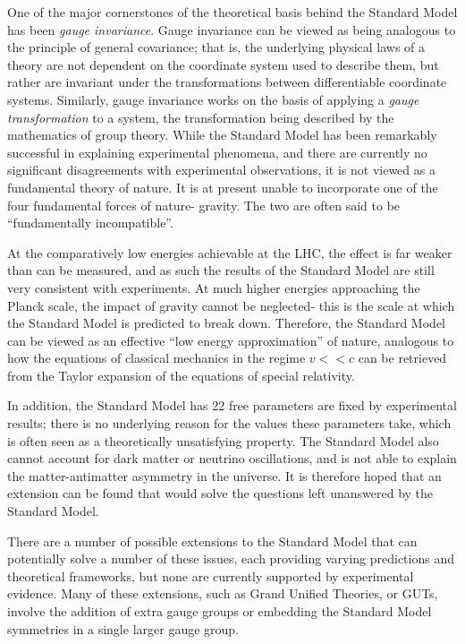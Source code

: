 \documentclass{article}
\begin{document}
One of the major cornerstones of the theoretical basis behind the Standard Model has been \textit{gauge invariance}. Gauge invariance can be viewed as being analogous to the principle of general covariance; that is, the underlying physical laws of a theory are not dependent on the coordinate system used to describe them, but rather are invariant under the transformations between differentiable coordinate systems. Similarly, gauge invariance works on the basis of applying a \textit{gauge transformation} to a system, the transformation being described by the mathematics of group theory. 
While the Standard Model has been remarkably successful in explaining experimental phenomena, and there are currently no significant disagreements with experimental observations, it is not viewed as a fundamental theory of nature. It is at present unable to incorporate one of the four fundamental forces of nature- gravity. The two are often said to be ``fundamentally incompatible''.

At the comparatively low energies achievable at the LHC, the effect is far weaker than can be measured, and as such the results of the Standard Model are still very  consistent with experiments. At much higher energies approaching the Planck scale, the impact of gravity cannot be neglected- this is the scale at which the Standard Model is predicted to break down. Therefore, the Standard Model can be viewed as an effective ``low energy approximation'' of nature, analogous to how the equations of classical mechanics in the regime $v<<c$ can be retrieved from the Taylor expansion of the equations of special relativity.

In addition, the Standard Model has 22 free parameters are fixed by experimental results; there is no underlying reason for the values these parameters take, which is often seen as a theoretically unsatisfying property. The Standard Model also cannot account for dark matter or neutrino oscillations, and is not able to explain the matter-antimatter asymmetry in the universe. It is therefore hoped that an extension can be found that would solve the questions left unanswered by the Standard Model. 

There are a number of possible extensions to the Standard Model that can potentially solve a number of these issues, each providing varying predictions and theoretical frameworks, but none are currently supported by experimental evidence. Many of these extensions, such as Grand Unified Theories, or GUTs, involve the addition of extra gauge groups or embedding the Standard Model symmetries in a single larger gauge group.
\end{document}
